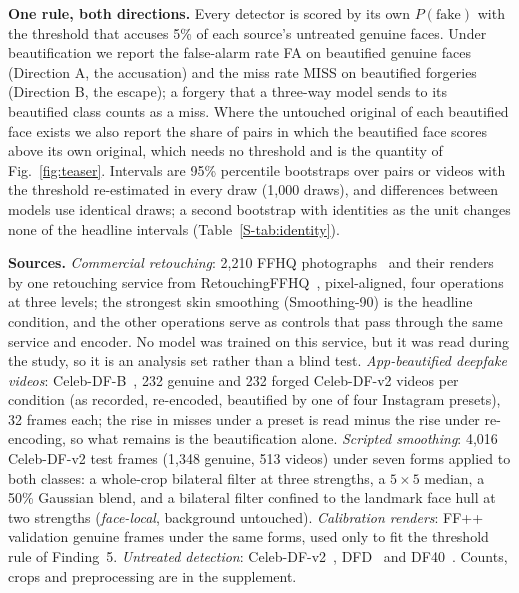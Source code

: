 \documentclass[conference]{IEEEtran}
\begin{document}
\textbf{One rule, both directions.} Every detector is scored by its own $P(\text{fake})$ with the threshold that accuses
5\% of each source's untreated genuine faces. Under beautification we report the false-alarm rate FA on beautified genuine
faces (Direction A, the accusation) and the miss rate MISS on beautified forgeries (Direction B, the escape); a forgery that a
three-way model sends to its beautified class counts as a miss. Where the untouched original of each beautified face exists
we also report the share of pairs in which the beautified face scores above its own original, which needs no threshold and
is the quantity of Fig.~\ref{fig:teaser}. Intervals are 95\% percentile bootstraps over pairs or videos with the threshold
re-estimated in every draw (1,000 draws), and differences between models use identical draws; a second bootstrap with
identities as the unit changes none of the headline intervals (Table~\ref{S-tab:identity}).

\textbf{Sources.} \emph{Commercial retouching}: 2,210 FFHQ photographs~\cite{ffhq} and their renders by one retouching
service from RetouchingFFHQ~\cite{retouchingffhq}, pixel-aligned, four operations at three levels; the strongest skin
smoothing (Smoothing-90) is the headline condition, and the other operations serve as controls that pass through the same
service and encoder. No model was trained on this service, but it was read during the study, so it is an analysis set rather
than a blind test. \emph{App-beautified deepfake videos}: Celeb-DF-B~\cite{libourel2024}, 232 genuine and 232 forged
Celeb-DF-v2 videos per condition (as recorded, re-encoded, beautified by one of four Instagram presets), 32 frames each; the
rise in misses under a preset is read minus the rise under re-encoding, so what remains is the beautification alone.
\emph{Scripted smoothing}: 4,016 Celeb-DF-v2 test frames (1,348 genuine, 513 videos)
under seven forms applied to both classes: a whole-crop bilateral filter at three strengths, a $5\times5$ median, a 50\%
Gaussian blend, and a bilateral filter confined to the landmark face hull at two strengths (\emph{face-local}, background
untouched). \emph{Calibration renders}: FF++ validation genuine frames under the same forms, used only to fit the threshold
rule of Finding~5. \emph{Untreated detection}: Celeb-DF-v2~\cite{celebdf}, DFD~\cite{dfd} and DF40~\cite{df40}. Counts,
crops and preprocessing are in the supplement.
\end{document}
